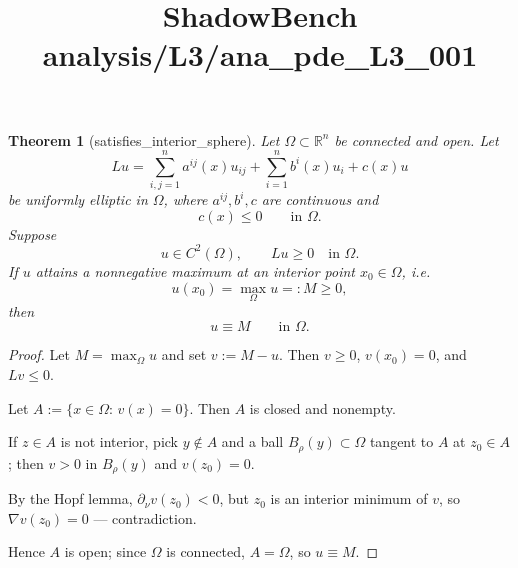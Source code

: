 \documentclass{article}
\title{ShadowBench analysis/L3/ana\_pde\_L3\_001}
\newtheorem{theorem}{Theorem}
\begin{document}
\maketitle

\begin{theorem}[satisfies_interior_sphere]
Let $\Omega\subset \mathbb{R}^n$ be connected and open. Let
\[
Lu
=
\sum_{i,j=1}^n a^{ij}(x)u_{ij}
+
\sum_{i=1}^n b^i(x)u_i
+
c(x)u
\]
be uniformly elliptic in $\Omega$, where $a^{ij},b^i,c$ are continuous and
\[
c(x)\le 0 \qquad \text{in } \Omega.
\]
Suppose
\[
u\in C^2(\Omega), \qquad Lu\ge 0 \quad \text{in } \Omega.
\]
If $u$ attains a nonnegative maximum at an interior point $x_0\in \Omega$, i.e.
\[
u(x_0)=\max_{\Omega}u=:M\ge 0,
\]
then
\[
u\equiv M
\qquad \text{in } \Omega.
\]
\end{theorem}
\begin{proof}
Let $M=\max_{\Omega}u$ and set $v:=M-u$. Then $v\ge 0$, $v(x_0)=0$, and $Lv\le 0$.

Let $A:=\{x\in\Omega:\, v(x)=0\}$. Then $A$ is closed and nonempty.

If $z\in A$ is not interior, pick $y\notin A$ and a ball $B_\rho(y)\subset\Omega$ tangent to $A$ at $z_0\in A$; then $v>0$ in $B_\rho(y)$ and $v(z_0)=0$.

By the Hopf lemma, $\partial_\nu v(z_0)<0$, but $z_0$ is an interior minimum of $v$, so $\nabla v(z_0)=0$ — contradiction.

Hence $A$ is open; since $\Omega$ is connected, $A=\Omega$, so $u\equiv M$.
\end{proof}
\end{document}
